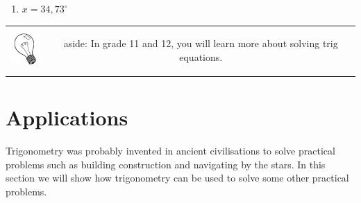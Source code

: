{\begin{mdframed}[linewidth=4, leftmargin=40, rightmargin=40]
\begin{exercise}
\begin{enumerate}[noitemsep, label=\textbf{Step} \textbf{\arabic*}. ]
{\begin{equation}
      \end{equation}
    }{%
    \setlength{\mymathboxwidth}{\columnwidth}
      \addtolength{\mymathboxwidth}{-48pt}
    \par\vspace{12pt}\noindent\begin{minipage}{\columnwidth}
    \parbox[t]{\mymathboxwidth}{\large\begin{math}
    3cos\left(2x+{38}^{\circ }\right)=2-3cos\left(2x+{38}^{\circ }\right)=\frac{-1}{3}\left(2x+{38}^{\circ }\right)=107,{46}^{\circ }2x=107,{46}^{\circ }-{38}^{\circ }2x=69,{46}^{\circ }x=34,{73}^{\circ }\end{math}}\hfill
    \parbox[t]{48pt}{\raggedleft 
    (14.24)}
    \end{minipage}\vspace{12pt}\par
    }%
\item 
\begin{math}x=34,{73}^{\circ }\end{math}
\end{enumerate}
    \end{exercise}
    \end{mdframed}
    }
    \noindent
  \label{m39411*eip-858}
\begin{tabular}{cc}
	\hspace*{-50pt}\includegraphics[width=0.5in]{col11306.imgs/psbulb2.png}  & 
	\begin{minipage}{0.85\textwidth}
	\begin{note}
      {aside: }In grade 11 and 12, you will learn more about solving trig equations. 
	\end{note}
	\end{minipage}
	\end{tabular}
\section{Applications}
 \label{m39411*id81626}Trigonometry was probably invented in ancient civilisations to solve practical problems such as building construction and navigating by the stars. In this section we will show how trigonometry can be used to solve some other practical problems.\par 
